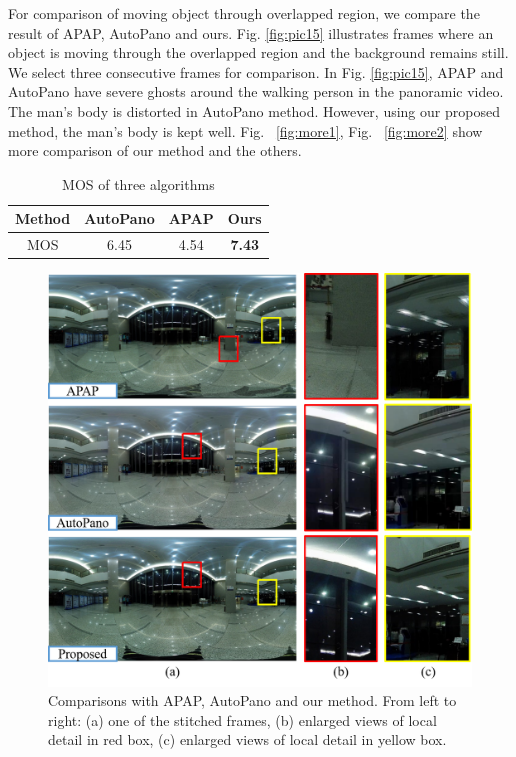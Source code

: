 \documentclass[conference]{IEEEtran}
\begin{document}
For comparison of moving object through overlapped region, we compare the result of APAP, AutoPano and ours. Fig. \ref{fig:pic15} 
illustrates frames where an object is moving through the overlapped region and the background remains still. 
We select three consecutive frames for comparison. In Fig. \ref{fig:pic15}, APAP and AutoPano have severe ghosts around the walking person in the panoramic video. 
The man’s body is distorted in AutoPano method. However, using our proposed method, the man's body is kept well. 
Fig. ~\ref{fig:more1}, Fig. ~\ref{fig:more2} show more comparison of our method and the others.
\begin{table}[!htpb]
\caption{MOS of three algorithms}
\label{tab1:table1}
\centering
\begin{tabular}{c|c|c|c}
\hline
Method& AutoPano& APAP& Ours\\
\hline
MOS& 6.45& 4.54& \bf{7.43}\\
\hline
\end{tabular}
\end{table}
\begin{figure}[!htpb]
\centering
\includegraphics[scale=0.415]{picture35.png}
\caption{Comparisons with APAP, AutoPano and our method. From left to right: (a) one of the stitched frames, (b) enlarged views of local
detail in red box, (c) enlarged views of local detail in yellow box.}
\label{fig:pic17}
\end{figure}
\end{document}

